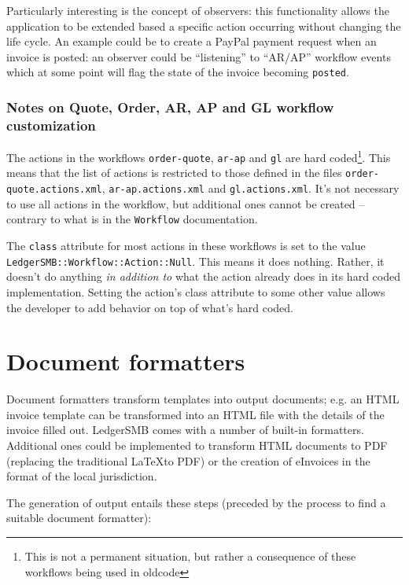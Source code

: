 Particularly interesting is the concept of observers:
this functionality allows the application to be extended based a specific action
occurring without changing the life cycle.  An example could be to create a PayPal
payment request when an invoice is posted: an observer could be ``listening'' to
``AR/AP'' workflow events which at some point will flag the state of the invoice
becoming \texttt{posted}.

\subsubsection{Notes on Quote, Order, AR, AP and GL workflow customization}

The actions in the workflows \texttt{order-quote}, \texttt{ar-ap} and \texttt{gl} are
hard coded\footnote{This is not a permanent situation, but rather a consequence of
these workflows being used in \gls{oldcode}}.  This means that the list of actions is restricted to those defined in the
files \texttt{order-quote.actions.xml}, \texttt{ar-ap.actions.xml} and
\texttt{gl.actions.xml}.  It's not necessary to use all actions in the workflow, but
additional ones cannot be created -- contrary to what is in the \texttt{Workflow}
documentation.

The \texttt{class} attribute for most actions in these workflows is set to the value
\texttt{LedgerSMB::Workflow::Action::Null}.  This means it does nothing.  Rather, it
doesn't do anything \textit{in addition to} what the action already does in its hard
coded implementation.  Setting the action's class attribute to some other value allows
the developer to add behavior on top of what's hard coded.

\section{Document formatters}

Document formatters transform templates into output documents; e.g. an HTML invoice
template can be transformed into an HTML file with the details of the invoice filled
out.  LedgerSMB comes with a number of built-in formatters.  Additional ones could be
implemented to transform HTML documents to PDF (replacing the traditional \LaTeX to PDF)
or the creation of eInvoices in the format of the local jurisdiction.

The generation of output entails these steps (preceded by the process to find a
suitable document formatter):

